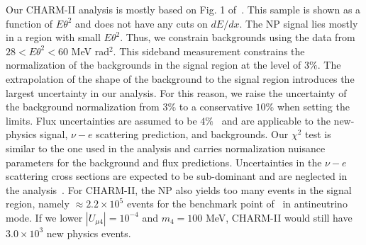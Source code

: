 Our CHARM-II analysis is mostly based on Fig. 1 of~\cite{Vilain:1994qy}. This sample is shown as a function of $E\theta^2$ and does not have any cuts on $dE/dx$. The NP signal lies mostly in a region with small $E\theta^2$. Thus, we constrain backgrounds using the data from $28 < E\theta^2 < 60$ MeV rad$^2$. This sideband measurement constrains the normalization of the backgrounds in the signal region at the level of $3\%$.
The extrapolation of the shape of the background to the signal region introduces the largest uncertainty in our analysis. For this reason, we raise the uncertainty of the background normalization from $3\%$ to a conservative $10 \%$ when setting the limits. Flux uncertainties are assumed to be $4\%$~\cite{Allaby:1987bb} and are applicable to the new-physics signal, $\nu-e$ scattering prediction, and backgrounds. 
Our $\chi^2$ test is similar to the one used in the \minerva analysis and carries normalization nuisance parameters for the background and flux predictions. Uncertainties in the $\nu-e$ scattering cross sections are expected to be sub-dominant and are neglected in the analysis~\cite{deGouvea:2006hfo}. For CHARM-II, the NP also yields too many events in the signal region, namely $\approx 2.2\times10^{5}$ events for the benchmark point of~\cite{Bertuzzo:2018itn} in antineutrino mode. If we lower $|U_{\mu4}| = 10^{-4}$ and $m_4 = 100$ MeV, CHARM-II would still have $3.0\times 10^3$ new physics events. 

